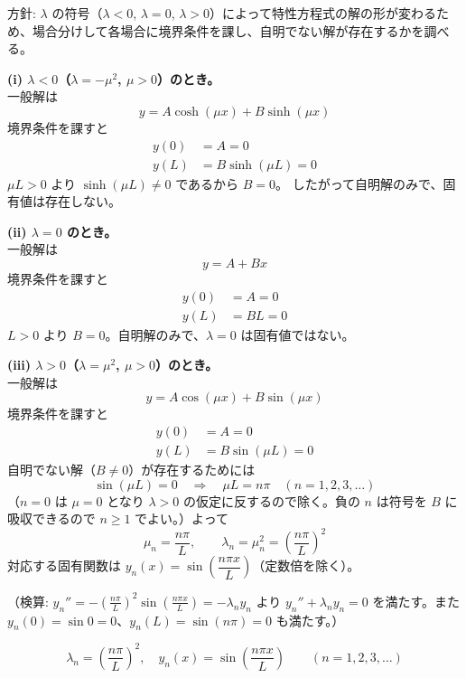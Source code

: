 
方針: $\lambda$ の符号（$\lambda < 0$, $\lambda = 0$, $\lambda > 0$）によって特性方程式の解の形が変わるため、場合分けして各場合に境界条件を課し、自明でない解が存在するかを調べる。

\textbf{(i) $\lambda < 0$（$\lambda = -\mu^{2}$, $\mu>0$）のとき。}\\
一般解は
\[
y = A\cosh(\mu x) + B\sinh(\mu x)
\]
境界条件を課すと
\begin{align*}
y(0) &= A = 0 \\
y(L) &= B\sinh(\mu L) = 0
\end{align*}
$\mu L > 0$ より $\sinh(\mu L) \neq 0$ であるから $B = 0$。
したがって自明解のみで、固有値は存在しない。

\textbf{(ii) $\lambda = 0$ のとき。}\\
一般解は
\[
y = A + Bx
\]
境界条件を課すと
\begin{align*}
y(0) &= A = 0 \\
y(L) &= BL = 0
\end{align*}
$L > 0$ より $B = 0$。自明解のみで、$\lambda = 0$ は固有値ではない。

\textbf{(iii) $\lambda > 0$（$\lambda = \mu^{2}$, $\mu>0$）のとき。}\\
一般解は
\[
y = A\cos(\mu x) + B\sin(\mu x)
\]
境界条件を課すと
\begin{align*}
y(0) &= A = 0 \\
y(L) &= B\sin(\mu L) = 0
\end{align*}
自明でない解（$B \neq 0$）が存在するためには
\[
\sin(\mu L) = 0 \quad\Longrightarrow\quad \mu L = n\pi \quad (n = 1, 2, 3, \dots)
\]
（$n=0$ は $\mu=0$ となり $\lambda>0$ の仮定に反するので除く。負の $n$ は符号を $B$ に吸収できるので $n \ge 1$ でよい。）よって
\[
\mu_{n} = \frac{n\pi}{L}, \qquad \lambda_{n} = \mu_{n}^{2} = \left(\frac{n\pi}{L}\right)^{2}
\]
対応する固有関数は $y_{n}(x) = \sin\!\left(\dfrac{n\pi x}{L}\right)$（定数倍を除く）。

（検算: $y_n'' = -\left(\frac{n\pi}{L}\right)^2 \sin\left(\frac{n\pi x}{L}\right) = -\lambda_n y_n$ より $y_n'' + \lambda_n y_n = 0$ を満たす。また $y_n(0) = \sin 0 = 0$、$y_n(L) = \sin(n\pi) = 0$ も満たす。）

\[
\boxed{\; \lambda_{n} = \left(\frac{n\pi}{L}\right)^{2}, \quad y_{n}(x) = \sin\!\left(\frac{n\pi x}{L}\right) \qquad (n = 1, 2, 3, \dots) \;}
\]
